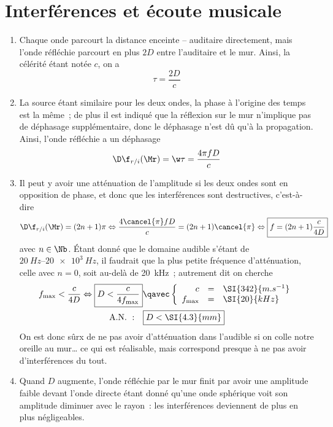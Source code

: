 \documentclass[a4paper, 12pt, final, garamond]{book}
\begin{document}
\section{Interférences et écoute musicale}
\begin{enumerate}
    \item Chaque onde parcourt la distance enceinte -- auditaire directement,
        mais l'onde réfléchie parcourt en plus $2D$ entre l'auditaire et le mur.
        Ainsi, la célérité étant notée $c$, on a
        \[\tau = \frac{2D}{c}\]
    \item La source étant similaire pour les deux ondes, la phase à l'origine
        des temps est la même~; de plus il est indiqué que la réflexion
        sur le mur n'implique pas de déphasage supplémentaire, donc le déphasage
        n'est dû qu'à la propagation. Ainsi, l'onde réfléchie a un déphasage
        \[\D\f_{r/i}(\Mr) = \w\tau = \frac{4\pi fD}{c}\]
    \item Il peut y avoir une atténuation de l'amplitude si les deux ondes sont
        en opposition de phase, et donc que les interférences sont destructives,
        c'est-à-dire
        \begin{gather*}
            \D\f_{r/i}(\Mr) = (2n+1)\pi
            \Leftrightarrow
            \frac{4\cancel{\pi}fD}{c} = (2n+1)\cancel{\pi}
            \Leftrightarrow
            \boxed{f = (2n+1) \frac{c}{4D}}
        \end{gather*}
        avec $n\in\Nb$. Étant donné que le domaine audible s'étant de
        $\SIrange{20}{20e3}{Hz}$, il faudrait que la plus petite fréquence
        d'atténuation, celle avec $n=0$, soit au-delà de \SI{20}{kHz}~;
        autrement dit on cherche
        \begin{gather*}
            f_{\max} < \frac{c}{4D} 
            \Leftrightarrow
            \boxed{D < \frac{c}{4f_{\max}}}
            \qavec
            \left\{
                \begin{array}{rcl}
                    c & = & \SI{342}{m.s^{-1}}\\
                    f_{\max} & = & \SI{20}{kHz}
                \end{array}
            \right.\\
            \mathrm{A.N.~:}\quad
            \boxed{D < \SI{4.3}{mm}}
        \end{gather*}
        On est donc sûrx de ne pas avoir d'atténuation dans l'audible si on
        colle notre oreille au mur… ce qui est réalisable, mais correspond
        presque à ne pas avoir d'interférences du tout.
    \item Quand $D$ augmente, l'onde réfléchie par le mur finit par avoir une
        amplitude faible devant l'onde directe étant donné qu'une onde sphérique
        voit son amplitude diminuer avec le rayon~: les interférences deviennent
        de plus en plus négligeables.
\end{enumerate}
\end{document}
